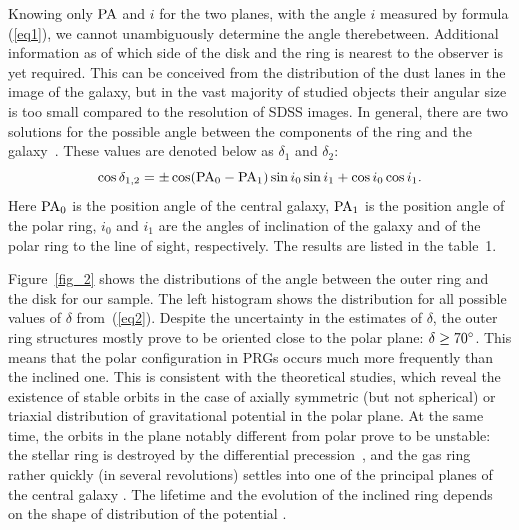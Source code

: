 \documentclass{ab}
\def\degr{\hbox{$^\circ$}}
\begin{document}
Knowing only $\rm PA$ and $i$ for the two planes, with the angle
$i$ measured by formula (\ref{eq1}), we cannot
unambiguously determine the angle therebetween. Additional
information as of which side of the disk and the ring is
nearest to the observer is yet required. This can be
conceived from the distribution of the dust lanes in the image of
the galaxy, but in the vast majority of studied objects their
angular size is too small compared to the resolution of SDSS
images. In general, there are two solutions for the possible angle
between the components of the ring and the
galaxy~\citep{Moiseev2008}. These values are denoted
below as \linebreak $\delta_1$ and $\delta_2$:
\begin{equation}
\cos \delta_{1,2} =  \pm\cos ({\rm PA}_0-{\rm PA}_1) \sin i_0 \sin i_1  
 +\cos i_0 \cos i_1.
\label{eq2}
\end{equation}
Here ${\rm PA}_0$ is the position angle of the central galaxy,
${\rm PA}_1$ is the position angle of the polar ring,  $i_0$ and
$i_1$  are the angles of inclination of the galaxy and of the
polar ring to the line of sight, respectively. The results are
listed in the table~1.





Figure~\ref{fig_2} shows the distributions of the angle
between the outer ring and the disk for our sample. The left
histogram shows the distribution for all possible values of
$\delta$ from~(\ref{eq2}). Despite the uncertainty in
the estimates of $\delta$, the outer ring structures mostly prove
to be oriented close to the polar plane:  $\delta\ge70\degr$. This
means that the polar configuration in PRGs occurs much more
frequently than the inclined one. This is consistent with the
theoretical studies, which reveal the existence of stable orbits
in the case of axially symmetric (but not spherical) or triaxial
distribution of gravitational potential in the polar plane. At the
same time, the orbits in the plane notably different from polar
prove to be unstable: the stellar ring is destroyed by the
differential precession~\citep{Sparke1986}, and the gas
ring rather quickly (in several revolutions) settles into one of
the principal planes of the central galaxy  \citep[see, e.g.][]{HabeIkeuchi1985}. The lifetime
and the   evolution of the inclined ring depends on
the shape of distribution of the potential
\citep[][and references therein]{Peletier1993,Ideta2000}.
\end{document}
